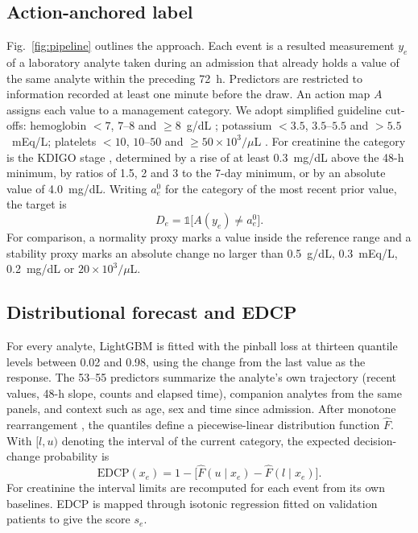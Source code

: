 \documentclass[conference]{IEEEtran}
\begin{document}
\subsection{Action-anchored label}
Fig.~\ref{fig:pipeline} outlines the approach. Each event is a resulted measurement $y_e$ of a laboratory analyte taken during an admission that already holds a value of the same analyte within the preceding 72~h. Predictors are restricted to information recorded at least one minute before the draw. An action map $A$ assigns each value to a management category. We adopt simplified guideline cut-offs: hemoglobin $<7$, $7$--$8$ and $\ge 8$~g/dL \cite{carson2016aabb}; potassium $<3.5$, $3.5$--$5.5$ and $>5.5$~mEq/L; platelets $<10$, $10$--$50$ and $\ge 50\times10^3/\mu$L \cite{kaufman2015platelet}. For creatinine the category is the KDIGO stage \cite{kdigo2012}, determined by a rise of at least 0.3~mg/dL above the 48-h minimum, by ratios of 1.5, 2 and 3 to the 7-day minimum, or by an absolute value of 4.0~mg/dL. Writing $a^0_e$ for the category of the most recent prior value, the target is
\begin{equation}
D_e=\mathbb{1}\big[A(y_e)\neq a^0_e\big].
\label{eq:label}
\end{equation}
For comparison, a normality proxy marks a value inside the reference range and a stability proxy marks an absolute change no larger than 0.5~g/dL, 0.3~mEq/L, 0.2~mg/dL or $20\times10^3/\mu$L.

\subsection{Distributional forecast and EDCP}
For every analyte, LightGBM \cite{ke2017lightgbm} is fitted with the pinball loss \cite{koenker1978} at thirteen quantile levels between 0.02 and 0.98, using the change from the last value as the response. The 53--55 predictors summarize the analyte's own trajectory (recent values, 48-h slope, counts and elapsed time), companion analytes from the same panels, and context such as age, sex and time since admission. After monotone rearrangement \cite{chernozhukov2010}, the quantiles define a piecewise-linear distribution function $\hat F$. With $[l,u)$ denoting the interval of the current category, the expected decision-change probability is
\begin{equation}
\mathrm{EDCP}(x_e)=1-\big[\hat F(u\mid x_e)-\hat F(l\mid x_e)\big].
\label{eq:edcp}
\end{equation}
For creatinine the interval limits are recomputed for each event from its own baselines. EDCP is mapped through isotonic regression fitted on validation patients to give the score $s_e$.
\end{document}
